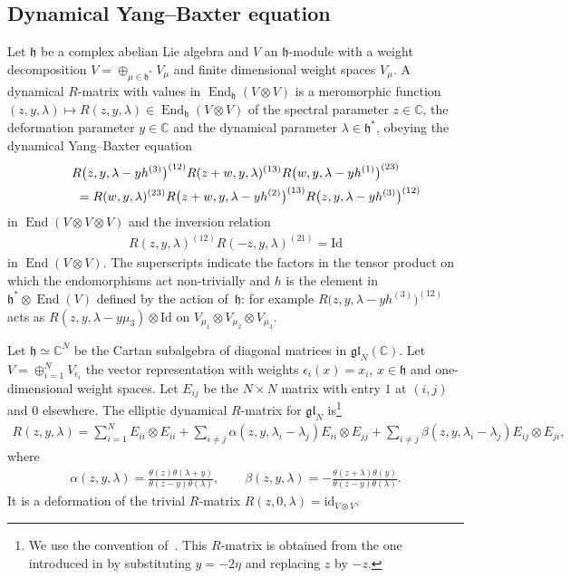 \documentclass[pdftex]{sigma}
\numberwithin{equation}{section}
\begin{document}
\subsection{Dynamical Yang--Baxter equation}\label{ss-2.1}
Let $\mathfrak h$ be a complex abelian Lie algebra and $V$ an $\mathfrak h$-module with a weight decomposition $V=\oplus_{\mu\in\mathfrak h^*}V_\mu$ and finite dimensional weight spaces $V_\mu$. A dynamical $R$-matrix with values in $\operatorname{End}_{\mathfrak h}(V\otimes V)$ is a meromorphic function $(z,y,\lambda)\mapsto R(z,y,\lambda)\in\operatorname{End}_{\mathfrak h}(V\otimes V)$ of the spectral parameter $z\in\mathbb C$, the deformation parameter $y\in\mathbb C$ and the dynamical parameter $\lambda\in\mathfrak h^*$, obeying the dynamical Yang--Baxter equation
\begin{gather}
 R\big(z,y,\lambda-y h^{(3)}\big)^{(12)}R(z+w,y,\lambda)^{(13)} R\big(w,y,\lambda-y h^{(1)}\big)^{(23)} \notag\\
 \qquad {}= R(w,y,\lambda)^{(23)}R\big(z+w,y,\lambda-y h^{(2)}\big)^{(13)} R\big(z,y,\lambda-y h^{(3)}\big)^{(12)}\label{e-YBE}
\end{gather}
in $\operatorname{End}(V\otimes V\otimes V)$ and the inversion relation
\begin{gather}\label{e-inversion}
 R(z,y,\lambda)^{(12)}R(-z,y,\lambda)^{(21)}=\mathrm{Id}
\end{gather}
in $\operatorname{End}(V\otimes V)$. The superscripts indicate the factors in the tensor product on which the endomorphisms act non-trivially and $h$ is the element in $\mathfrak h^*\otimes \operatorname{End}(V)$ defined by the action of~$\mathfrak h$: for example $R\big(z,y,\lambda-y h^{(3)}\big)^{(12)}$ acts as $R(z,y,\lambda-y\mu_3)\otimes \mathrm{Id}$ on $V_{\mu_1}\otimes V_{\mu_2}\otimes V_{\mu_3}$.
\begin{Example}\label{example-1} Let $\mathfrak h\simeq\mathbb C^N$ be the Cartan subalgebra of diagonal matrices in $\mathfrak{gl}_N(\mathbb C)$. Let $V=\oplus_{i=1}^N V_{\epsilon_i}$ the vector representation with weights $\epsilon_i(x)=x_i$, $x\in\mathfrak h$ and one-dimensional weight spaces. Let $E_{ij}$ be the $N\times N$ matrix with entry $1$ at $(i,j)$ and $0$ elsewhere. The elliptic dynamical $R$-matrix
 for $\mathfrak{gl}_N$ is\footnote{We use the convention of~\cite{FelderVarchenko}. This $R$-matrix is obtained from the one introduced in \cite{Felder} by substituting $y=-2\eta$ and replacing $z$ by $-z$.}
 \begin{gather*}
 R(z,y,\lambda) =\sum_{i=1}^NE_{ii}\otimes E_{ii}+\sum_{i\neq j}\alpha(z,y,\lambda_i-\lambda_j) E_{ii}\otimes E_{jj} +\sum_{i\neq j}\beta(z,y,\lambda_i-\lambda_j) E_{ij}\otimes E_{ji},
 \end{gather*}
 where
 \begin{gather*}
 \alpha(z,y,\lambda)= \frac{\theta(z)\theta(\lambda+y)}{\theta(z-y)\theta(\lambda)}, \qquad \beta(z,y,\lambda)= -\frac{\theta(z+\lambda)\theta(y)}{\theta(z-y)\theta(\lambda)}.
 \end{gather*}
 It is a deformation of the trivial $R$-matrix $R(z,0,\lambda)=\mathrm{id}_{V\otimes V}$.
\end{Example}
\end{document}
